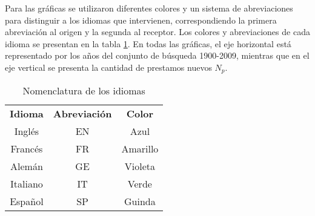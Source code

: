 



Para las gráficas se utilizaron diferentes colores  y un sistema de abreviaciones para distinguir a los idiomas que intervienen, correspondiendo la primera abreviación al origen y la segunda al receptor. Los colores y abreviaciones de cada idioma se presentan  en la tabla \ref{tab.idcolor}. En todas las gráficas, el eje horizontal está representado por los años del conjunto de búsqueda 1900-2009,  mientras que en el eje vertical se presenta la
cantidad de prestamos nuevos $N_{p}$. 


\begin{table} %
	\centering
	\begin{tabular}{ccc}
		\textbf{Idioma} & \textbf{Abreviación} & \textbf{Color} \\
		Inglés          & EN                   & Azul           \\
		Francés         & FR                   & Amarillo       \\
		Alemán          & GE                   & Violeta        \\
		Italiano        & IT                   & Verde          \\
		Español         & SP                   & Guinda        
	\end{tabular}
	\caption{Nomenclatura de los idiomas}
	\label{tab.idcolor}
\end{table} %




	


